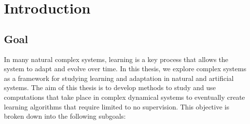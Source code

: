 \chapter{Introduction}
\label{cha:introduction}

\section{Goal}

In many natural complex systems, learning is a key process that allows the
system to adapt and evolve over time. In this thesis, we explore complex systems
as a framework for studying learning and adaptation in natural and artificial
systems. The aim of this thesis is to develop methods to study and use
computations that take place in complex dynamical systems to eventually create
learning algorithms that require limited to no supervision. This objective is
broken down into the following subgoals:

